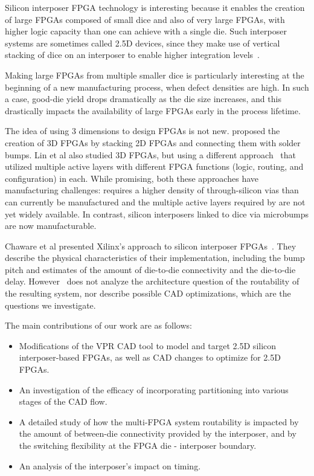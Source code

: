 \documentclass[journal]{IEEEtran}
\begin{document}
Silicon interposer FPGA technology is interesting because it enables the creation of large FPGAs composed of small dice and also of very large FPGAs, with higher logic capacity than one can achieve with a single die. Such interposer systems are sometimes called 2.5D devices, since they make use of vertical stacking of dice on an interposer to enable higher integration levels~\cite{3dhandbook}.

Making large FPGAs from multiple smaller dice is particularly interesting at the beginning of a new manufacturing process, when defect densities are high. In such a case, good-die yield drops dramatically as the die size increases, and this drastically impacts the availability of large FPGAs early in the process lifetime.

The idea of using 3 dimensions to design FPGAs is not new. \cite{3dfpga1995} proposed the creation of 3D FPGAs by stacking 2D FPGAs and connecting them with solder bumps. Lin et al also studied 3D FPGAs, but using a different approach~\cite{3dfpga} that utilized multiple active layers with different FPGA functions (logic, routing, and configuration) in each. While promising, both these approaches have manufacturing challenges: \cite{3dfpga1995} requires a higher density of through-silicon vias than can currently be manufactured and the multiple active layers required by \cite{3dfpga} are not yet widely available. In contrast, silicon interposers linked to dice via microbumps are now manufacturable.

Chaware et al presented Xilinx's approach to silicon interposer FPGAs~\cite{xilinxTSV}. They describe the physical characteristics of their implementation, including the bump pitch and estimates of the amount of die-to-die connectivity and the die-to-die delay. However~\cite{xilinxTSV} does not analyze the architecture question of the routability of the resulting system, nor describe possible CAD optimizations, which are the questions we investigate.

The main contributions of our work are as follows:
\begin{itemize}
	\item Modifications of the VPR CAD tool to model and target 2.5D silicon interposer-based FPGAs, as well as CAD changes to optimize for 2.5D FPGAs.
	\item An investigation of the efficacy of incorporating partitioning into various stages of the CAD flow.
	\item A detailed study of how the multi-FPGA system routability is impacted by the amount of between-die connectivity provided by the interposer, and by the switching flexibility at the FPGA die - interposer boundary.
	\item An analysis of the interposer's impact on timing.
\end{itemize}
\end{document}
